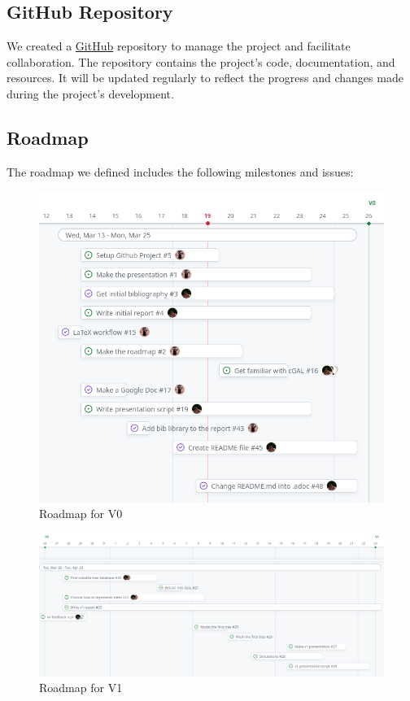 \documentclass[12pt]{article}
\begin{document}
\subsection{GitHub Repository}
We created a \href{https://github.com/master-csmi/2024-m1-vegetation}{GitHub} repository to manage the project and facilitate collaboration.
The repository contains the project's code, documentation, and resources. It will be
updated regularly to reflect the progress and changes made during the project's
development.

\subsection{Roadmap}
The roadmap we defined includes the following milestones and issues:

\begin{figure}[H]
    \centering
    \includegraphics[width=1\textwidth]{images/roadmap_v0.png}
    \caption{Roadmap for V0}
\end{figure}

\begin{figure}[H]
    \centering
    \includegraphics[width=1\textwidth]{images/roadmap_v1.png}
    \caption{Roadmap for V1}
\end{figure}
\end{document}
